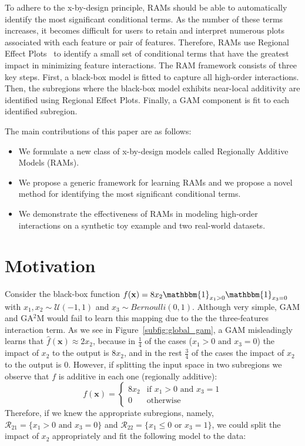 \documentclass[12pt]{article}
\newcommand{\xb}{\mathbf{x}}
\newcommand{\when}[1]{\mathbbm{1}_{#1}}
\begin{document}
To adhere to the x-by-design principle, RAMs should be able to automatically identify the
most significant conditional terms.
As the number of these terms increases, it becomes difficult for users to retain and interpret numerous plots
associated with each feature or pair of features.
Therefore, RAMs use Regional Effect Plots~\citep{herbinger2023decomposing} to identify a small set
of conditional terms that have the greatest impact in minimizing feature interactions.
The RAM framework consists of three key steps.
First, a black-box model is fitted to capture all high-order interactions.
Then, the subregions where the black-box model exhibits near-local additivity are identified using Regional Effect Plots.
Finally, a GAM component is fit to each identified subregion.

The main contributions of this paper are as follows:

\begin{itemize}
    \item We formulate a new class of x-by-design models called Regionally Additive Models (RAMs).
    \item We propose a generic framework for learning RAMs and we propose a novel method for identifying the most significant conditional terms.
    \item We demonstrate the effectiveness of RAMs in modeling high-order interactions on a synthetic toy example and two real-world datasets.
\end{itemize}

\section{Motivation}
\label{sec:motivation}

Consider the black-box function \(f(\xb) = 8x_2\when{x_1 > 0}\when{x_3=0}\)
with \(x_1, x_2 \sim \mathcal{U}(-1,1)\) and \(x_3 \sim Bernoulli(0,1)\).
Although very simple, GAM and GA$^2$M would fail to learn this mapping due to
the the three-features interaction term.
As we see in Figure~\ref{subfig:global_gam}, a GAM misleadingly learns that $\hat{f}(\xb) \approx 2x_2$,
because in $\frac{1}{4}$ of the cases ($x_1 > 0 \text{ and } x_3 = 0$) the impact of $x_2$ to the output is $8x_2$,
and in the rest $\frac{3}{4}$ of the cases the impact of $x_2$ to the output is $0$.
However, if splitting the input space in two subregions we observe that \(f\) is additive in each one (regionally additive):
%
\begin{equation}
    \label{eq:regionally_additive}
    f(\xb) = \begin{cases} 8x_2 & \text{if } x_1 > 0 \text{ and } x_3 = 1 \\ 0 & \text{otherwise} \end{cases}
\end{equation}
%
Therefore, if we knew the appropriate subregions,
namely, \(\mathcal{R}_{21} = \{x_1 > 0 \text{ and } x_3 = 0\}\)
and  \(\mathcal{R}_{22} = \{x_1 \leq 0 \text{ or } x_3 = 1\}\),
we could split the impact of $x_2$ appropriately and fit the following model to the data:
\end{document}
